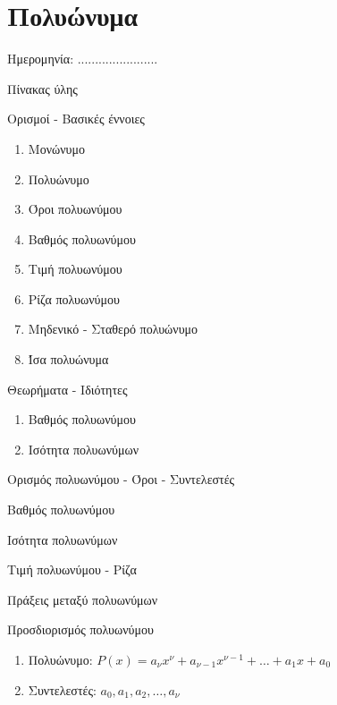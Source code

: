 \documentclass[twoside,nofonts,internet,math,spyros]{frontisthrio}
\newcommand{\myitem}{\stepcounter{enumi}\item[\raisebox{0.5mm}{\faExclamationTriangle}\ \Large$\square$]}
\begin{document}
\section{Πολυώνυμα}
\begin{flushright}
\faCalendar* Ημερομηνία: .......................
\end{flushright}
\begin{mybox}[mysubtitle]{Πίνακας ύλης}
\begin{tcbraster}[raster columns=2,raster equal height]
\begin{myleftbox}{Ορισμοί - Βασικές έννοιες\ \ \faBook}
\begin{enumerate}[itemsep=0mm]
\item Μονώνυμο
\item Πολυώνυμο
\item Όροι πολυωνύμου
\item Βαθμός πολυωνύμου
\item Τιμή πολυωνύμου
\item Ρίζα πολυωνύμου
\item Μηδενικό - Σταθερό πολυώνυμο
\item Ίσα πολυώνυμα
\end{enumerate}
\end{myleftbox}
\begin{myrightbox}{Θεωρήματα - Ιδιότητες\ \ \faTools}
\begin{enumerate}[itemsep=0mm]
\item Βαθμός πολυωνύμου
\item Ισότητα πολυωνύμων
\end{enumerate}
\end{myrightbox}
\end{tcbraster}
\begin{multicols}{2}
\begin{todolist}[itemsep=0mm]
\myitem Ορισμός πολυωνύμου - Όροι - Συντελεστές
\myitem Βαθμός πολυωνύμου
\item Ισότητα πολυωνύμων
\myitem Τιμή πολυωνύμου - Ρίζα
\item Πράξεις μεταξύ πολυωνύμων
\item Προσδιορισμός πολυωνύμου
\end{todolist}
\end{multicols}
\begin{multicols}{2}
\begin{enumerate}[itemsep=0mm,leftmargin=3mm]
\item Πολυώνυμο: $ P(x)=a_\nu x^\nu+a_{\nu-1}x^{\nu-1}+\ldots+a_1x+a_0 $
\item Συντελεστές: $ a_0,a_1,a_2,\ldots,a_{\nu} $
\end{enumerate}
\end{multicols}
\end{mybox}
\end{document}
